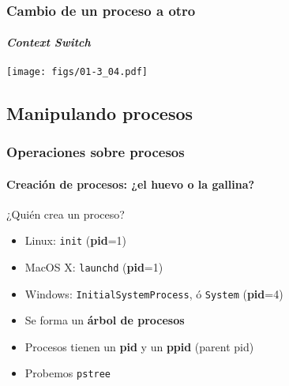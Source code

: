 \documentclass[letter]{beamer}
\begin{document}

\begin{frame}
  \frametitle{Cambio de un proceso a otro}
  \framesubtitle{{\em Context Switch}}
  
  \begin{center}
    \texttt{[image: figs/01-3\_04.pdf]}
  \end{center}

\end{frame}


\subsection{Manipulando procesos}

\begin{frame}
  \frametitle{Operaciones sobre procesos}
  \framesubtitle{Creación de procesos: ¿el huevo o la gallina?}
  ¿Quién crea un proceso? 
   
   

  \begin{itemize}
    \item<7->Linux: {\tt init} ({\bf pid}=1)
    \item<7->MacOS X: {\tt launchd} ({\bf pid}=1)
    \item<7->Windows: {\tt InitialSystemProcess}, ó {\tt System} ({\bf pid}=4)
  \end{itemize}

  \begin{itemize}
    \item<9-> Se forma un {\bf árbol de procesos}
    \item<9-> Procesos tienen un {\bf pid} y un {\bf ppid} (parent pid)
    \item<10-> Probemos {\tt pstree}
  \end{itemize}
\end{frame}
\end{document}
